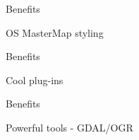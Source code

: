 \begin{frame}{Benefits}
	\begin{block}{OS MasterMap styling}
	\end{block}
\end{frame}

\begin{frame}{Benefits}
	\begin{block}{Cool plug-ins}
	\end{block}
\end{frame}


\begin{frame}{Benefits}
	\begin{block}{Powerful tools - GDAL/OGR}
	\end{block}
\end{frame}


